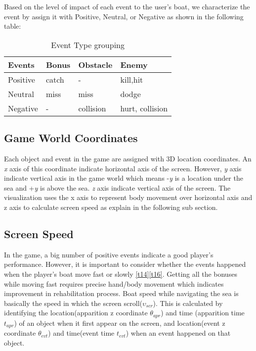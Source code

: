 Based on the level of impact of each event to the user's boat, we characterize the event by assign it with Positive, Neutral, or Negative as shown in the following table:
\begin{table}[h]
\begin{center}
    \begin{tabular}{| l | l | l | l |}
    \hline
    Events & Bonus & Obstacle & Enemy \\ \hline
    Positive & catch & - & kill,hit\\ \hline
    Neutral & miss & miss & dodge\\ \hline
    Negative & - & collision & hurt, collision\\
    \hline
    \end{tabular}
    \caption {Event Type grouping}
\end{center}
\end{table}

\subsection{Game World Coordinates}
Each object and event in the game are assigned with 3D location coordinates. An \textit{x} axis of this coordinate indicate horizontal axis of the screen. However, \textit{y} axis indicate vertical axis in the game world which means -\textit{y} is a location under the sea and +\textit{y} is above the sea. \textit{z} axis indicate vertical axis of the screen. The visualization uses the x axis to represent body movement over horizontal axis and z axis to calculate screen speed as explain in the following sub section.

\subsection{Screen Speed}
In the game, a big number of positive events indicate a good player's performance. However, it is important to consider whether the events happened when the player's boat move fast or slowly \ref{t14}\ref{t16}. Getting all the bonuses while moving fast requires precise hand/body movement which indicates improvement in rehabilitation process. Boat speed while navigating the sea is basically the speed in which the screen scroll($\upsilon_{scr}$). This is calculated by identifying the location(apparition z coordinate $\theta_{apr}$) and time (apparition time $\textit{t}_{apr}$) of an object when it first appear on the screen, and location(event z coordinate $\theta_{evt}$) and time(event time $\textit{t}_{evt}$) when an event happened on that object.

